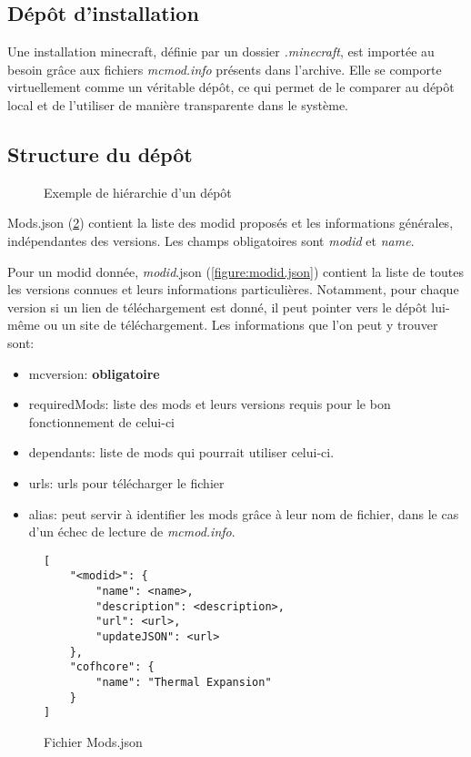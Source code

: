 \documentclass{article}
\begin{document}
\subsection{Dépôt d'installation}
\label{subsection:depot_installation}
Une installation minecraft, définie par un dossier \textit{.minecraft}, est importée au besoin grâce aux fichiers \textit{mcmod.info} présents dans l'archive.
Elle se comporte virtuellement comme un véritable dépôt, ce qui permet de le comparer au dépôt local et de l'utiliser de manière transparente dans le système.

\subsection{Structure du dépôt}
\begin{figure}
\caption{Exemple de hiérarchie d'un dépôt}
\label{fig:hierarchie}
\end{figure}

Mods.json (\ref{figure:mods.json}) contient la liste des modid proposés et les informations générales, indépendantes des versions.
Les champs obligatoires sont \textit{modid} et \textit{name}.

Pour un modid donnée, \textit{modid}.json (\ref{figure:modid.json}) contient la liste de toutes les versions connues et leurs informations particulières.
Notamment, pour chaque version si un lien de téléchargement est donné, il peut pointer vers le dépôt lui-même ou un site de téléchargement.
Les informations que l'on peut y trouver sont:
\begin{itemize}
    \item mcversion: \textbf{obligatoire}
    \item requiredMods: liste des mods et leurs versions requis pour le bon fonctionnement de celui-ci
    \item dependants: liste de mods qui pourrait utiliser celui-ci.
    \item urls: urls pour télécharger le fichier
    \item alias: peut servir à identifier les mods grâce à leur nom de fichier, dans le cas d'un échec de lecture de \textit{mcmod.info}.
\end{itemize}

\begin{figure}
\centering
\begin{verbatim}
[
    "<modid>": {
        "name": <name>,
        "description": <description>,
        "url": <url>,
        "updateJSON": <url>
    },
    "cofhcore": {
        "name": "Thermal Expansion"
    }
]
\end{verbatim}
\caption{Fichier Mods.json}
\label{figure:mods.json}
\end{figure}
\end{document}
